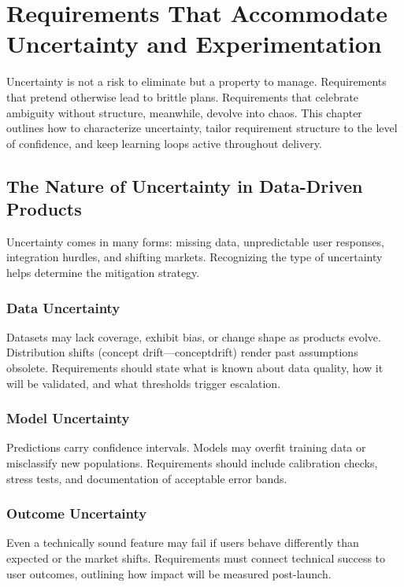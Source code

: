 \chapter{Requirements That Accommodate Uncertainty and Experimentation}
\label{ch:uncertainty-requirements}

Uncertainty is not a risk to eliminate but a property to manage. Requirements that pretend otherwise lead to brittle plans. Requirements that celebrate ambiguity without structure, meanwhile, devolve into chaos. This chapter outlines how to characterize uncertainty, tailor requirement structure to the level of confidence, and keep learning loops active throughout delivery.

\section{The Nature of Uncertainty in Data-Driven Products}
\label{sec:nature-uncertainty}

Uncertainty comes in many forms: missing data, unpredictable user responses, integration hurdles, and shifting markets. Recognizing the type of uncertainty helps determine the mitigation strategy.

\subsection{Data Uncertainty}
Datasets may lack coverage, exhibit bias, or change shape as products evolve. Distribution shifts (concept drift—\gls{conceptdrift}) render past assumptions obsolete. Requirements should state what is known about data quality, how it will be validated, and what thresholds trigger escalation.

\subsection{Model Uncertainty}
Predictions carry confidence intervals. Models may overfit training data or misclassify new populations. Requirements should include calibration checks, stress tests, and documentation of acceptable error bands.

\subsection{Outcome Uncertainty}
Even a technically sound feature may fail if users behave differently than expected or the market shifts. Requirements must connect technical success to user outcomes, outlining how impact will be measured post-launch.

